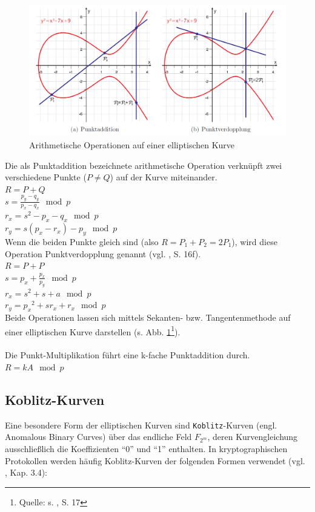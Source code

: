 \begin{figure}[H]
	\centering
	\includegraphics[width=\textwidth]{bilder/p-addition}
	\caption{Arithmetische Operationen auf einer elliptischen Kurve}
	\label{fig:padd}
\end{figure}

Die als Punktaddition bezeichnete arithmetische Operation verknüpft zwei verschiedene Punkte ($P \ne Q$) auf der Kurve miteinander. \\

$R = P + Q$ \\
$s = \frac{p_y-q_y}{p_x-q_x} \mod p$ \\
$r_x = s^2 - p_x - q_x \mod p$ \\
$r_y = s(p_x-r_x)-p_y \mod p$ \\

Wenn die beiden Punkte gleich sind (also $R = P_1 + P_2 = 2 P_1$), wird diese Operation Punktverdopplung genannt (vgl. \cite{puttmann}, S. 16f). \\

$R=P+P$ \\
$s=p_x + \frac{p_x}{p_y} \mod p$ \\  
$r_x=s^2 + s + a \mod p$ \\  
$r_y={p_x}^2 + s{r_x} + r_x \mod p$ \\

Beide Operationen lassen sich mittels Sekanten- bzw. Tangentenmethode auf einer elliptischen Kurve darstellen (s. Abb. \ref{fig:padd}\footnote{Quelle: s. \cite{puttmann}, S. 17}). 
\\ \\
Die Punkt-Multiplikation führt eine k-fache Punktaddition durch. \\

$R = k A \mod p$

\subsection{Koblitz-Kurven}
Eine besondere Form der elliptischen Kurven sind \texttt{Koblitz}-Kurven (engl. Anomalous Binary Curves) über das endliche Feld $F_{2^m}$, deren Kurvengleichung ausschließlich die Koeffizienten ``0'' und ``1'' enthalten. In kryptographischen Protokollen werden häufig Koblitz-Kurven der folgenden Formen verwendet (vgl. \cite{guide}, Kap. 3.4):

